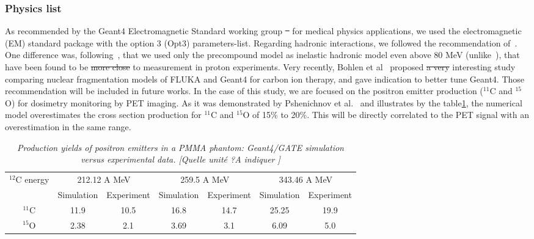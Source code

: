 \documentclass[11pt]{iopart}
\newcommand{\dsnote}[1]{{\color{green}[#1]}} %
\providecommand{\DIFaddtex}[1]{{\protect\color{blue}\uwave{#1}}} %
\providecommand{\DIFdeltex}[1]{{\protect\color{red}\sout{#1}}}                      %
\providecommand{\DIFaddbegin}{} %
\providecommand{\DIFaddend}{} %
\providecommand{\DIFdelbegin}{} %
\providecommand{\DIFdelend}{} %
\providecommand{\DIFaddbeginFL}{} %
\providecommand{\DIFaddendFL}{} %
\providecommand{\DIFdelbeginFL}{} %
\providecommand{\DIFdelendFL}{} %
\providecommand{\DIFadd}[1]{\texorpdfstring{\DIFaddtex{#1}}{#1}} %
\providecommand{\DIFdel}[1]{\texorpdfstring{\DIFdeltex{#1}}{}} %
\begin{document}
\subsubsection{Physics list}

As recommended by the Geant4 Electromagnetic Standard working group
\DIFdelbegin \DIFdel{~}%
\DIFdelend for medical physics applications\DIFaddbegin \DIFadd{~}\cite{G4EMGroup2010}\DIFaddend , we used the
electromagnetic (EM) standard package with the option 3 (Opt3)
parameters-list. Regarding hadronic interactions, we followed the
recommendation of~\cite{Pshenichnov2007, Zacharatou2008}. One
difference was, following~\cite{Polf2009, Peterson2009,
  Grevillot2010}, that we used only the precompound model as inelastic
hadronic model even above 80 MeV (unlike~\cite{Pshenichnov2007}), that
have been found to be \DIFdelbegin \DIFdel{more close }\DIFdelend \DIFaddbegin \DIFadd{closer }\DIFaddend to measurement in proton
experiments. Very recently, Bohlen et al~\cite{Bohlen2010} proposed \DIFdelbegin \DIFdel{a very }\DIFdelend \DIFaddbegin \DIFadd{an
}\DIFaddend interesting study comparing nuclear fragmentation models of FLUKA and
Geant4 for carbon ion therapy, and gave indication to better tune
Geant4. Those recommendation will be included in future works.  In the
case of this study, we are focused on the positron emitter production
($^{11}$C and $^{15}$O) for dosimetry monitoring by PET imaging. As it
was demonstrated by Pshenichnov et al.~\cite{Pshenichnov2006} and
illustrates by the table\DIFaddbegin \DIFadd{~}\DIFaddend \ref{tab:CrossSection}, the numerical model
overestimates the cross section production for $^{11}$C and $^{15}$O
of 15\% to 20\%. This will be directly correlated to the PET signal
with an overestimation in the same range.

\begin{table}[htbp]
\begin{center}
  \begin{tabular}{|c|c|c|c|c|c|c|} \hline
    $^{12}$C energy  & \multicolumn{2}{|c|}{212.12 A MeV}  & \multicolumn{2}{|c|}{259.5 A MeV}  & \multicolumn{2}{|c|}{343.46 A MeV}       \\
    \cline{2-7} & Simulation & Experiment & Simulation & Experiment &
    Simulation & Experiment \\ \hline \hline 
    \DIFdelbeginFL %

\DIFdelendFL $^{11}$C             & 11.9  &  10.5  &  16.8  &  14.7  &  25.25  &  19.9      \\ \hline
    $^{15}$O             & 2.38  &  2.1  &  3.69  &  3.1   &  6.09   &  5.0        \\ \hline \hline 

\end{tabular}
\end{center} 
\caption{\it Production yields of positron emitters in a PMMA phantom: Geant4/GATE simulation versus experimental data. \DIFaddbeginFL \dsnote{Quelle unité ?A indiquer }\DIFaddendFL } 
\label{tab:CrossSection}
\end{table}
\end{document}
